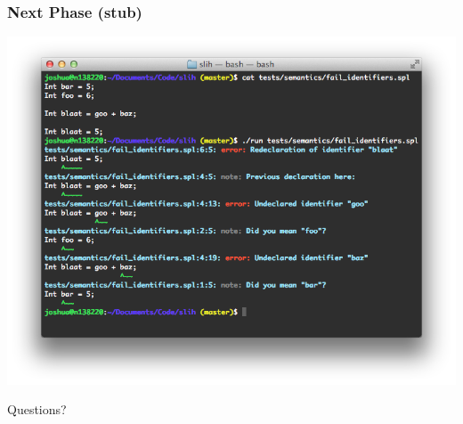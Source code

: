 \documentclass[14pt]{beamer}
\begin{document}
\begin{frame}
\frametitle{Next Phase (stub)}
\begin{center}
\includegraphics[width=\textwidth]{next_phase.png}
\end{center}
\end{frame}


\begin{frame}
\begin{center}
\Huge Questions?
\end{center}
\end{frame}
\end{document}
